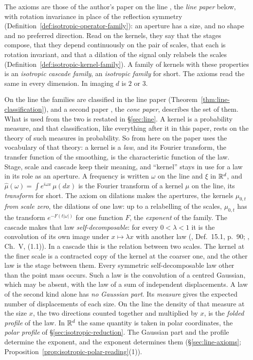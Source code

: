 The axioms are those of the author's paper on the line , the
\emph{line paper} below, with rotation invariance in place of the reflection symmetry
(Definition~\ref{def:isotropic-operator-family}): an aperture has a size, and no shape and no
preferred direction. Read on the kernels, they say that the stages
compose, that they depend continuously on the pair of scales, that each is rotation invariant,
and that a dilation of the signal only relabels the scales
(Definition~\ref{def:isotropic-kernel-family}). A family of kernels with these properties is an
\emph{isotropic cascade family}, an \emph{isotropic family} for short. The axioms read the same
in every dimension. In imaging $d$ is $2$ or $3$.

On the line the families are classified in the line paper
(Theorem~\ref{thm:line-classification}), and a second paper , the
\emph{cone paper}, describes the set of them. What is used from the two is restated in
\S\ref{sec:line}. A kernel is a probability measure, and that classification, like everything
after it in this paper, rests on the theory of such measures in probability. So from here on
the paper uses the vocabulary of that theory: a kernel is a \emph{law}, and its Fourier
transform, the transfer function of the smoothing, is the characteristic function of the law.
Stage, scale and cascade keep their meaning, and ``kernel'' stays in use for a law in its role
as an aperture. A frequency is written $\omega$ on the line and $\xi$ in $\mathbb{R}^d$, and
$\widehat\mu(\omega) = \int e^{i\omega x}\,\mu(dx)$ is the Fourier transform of a kernel $\mu$
on the line, its \emph{transform} for short. The axiom on dilations
makes the apertures, the kernels $\mu_{0,t}$ \emph{from scale zero}, the dilations of one law:
up to a relabelling of the scales, $\mu_{0,t}$ has the
transform $e^{-F(t|\omega|)}$ for one function $F$, the \emph{exponent} of the family. The
cascade makes that law \emph{self-decomposable}: for every $0 < \lambda < 1$ it is the
convolution of its own image under $x \mapsto \lambda x$ with another law
(, Def.~15.1, p.~90; , Ch.~V, (1.1)). In a
cascade this is the relation between two scales. The kernel at the finer scale is a contracted
copy of the kernel at the coarser one, and the other law is the stage between them. Every
symmetric self-decomposable law other than the point mass occurs. Such a law is the convolution
of a centred Gaussian, which may be absent, with the law of a sum of independent displacements.
A law of the second kind alone has \emph{no Gaussian part}. Its \emph{\Levy{} measure} gives the
expected number of displacements of each size. On the line the density of that measure at the
size $x$, the two directions counted together and multiplied by $x$, is the \emph{folded
profile} of the law. In $\mathbb{R}^d$ the same quantity is
taken in polar coordinates, the \emph{polar profile} of \S\ref{sec:isotropic-reduction}. The
Gaussian part and the profile determine the exponent, and the exponent determines them
(\S\ref{sec:line-axioms}; Proposition~\ref{prop:isotropic-polar-reading}(1)).

